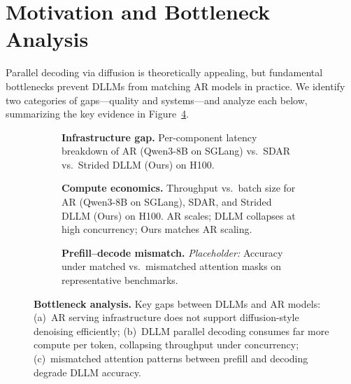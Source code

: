 \section{Motivation and Bottleneck Analysis}
\label{sec:motivation}

Parallel decoding via diffusion is theoretically appealing, but fundamental bottlenecks prevent DLLMs from matching AR models in practice. We identify two categories of gaps---quality and systems---and analyze each below, summarizing the key evidence in Figure~\ref{fig:bottlenecks}.

\begin{figure}[t]
\begin{center}
\begin{subfigure}[t]{0.32\textwidth}
\centering
\fbox{\rule[-.5cm]{0cm}{3.5cm} \rule[-.5cm]{0pt}{0cm}\hspace{3.8cm}}
\caption{\textbf{Infrastructure gap.} Per-component latency breakdown of AR (Qwen3-8B on SGLang) vs.\ SDAR vs.\ Strided DLLM (Ours) on H100. }
\label{fig:infra_bottleneck}
\end{subfigure}
\hfill
\begin{subfigure}[t]{0.32\textwidth}
\centering
\fbox{\rule[-.5cm]{0cm}{3.5cm} \rule[-.5cm]{0pt}{0cm}\hspace{3.8cm}}
\caption{\textbf{Compute economics.} Throughput vs.\ batch size for AR (Qwen3-8B on SGLang), SDAR, and Strided DLLM (Ours) on H100. AR scales; DLLM collapses at high concurrency; Ours matches AR scaling. }
\label{fig:compute_bottleneck}
\end{subfigure}
\hfill
\begin{subfigure}[t]{0.32\textwidth}
\centering
\fbox{\rule[-.5cm]{0cm}{3.5cm} \rule[-.5cm]{0pt}{0cm}\hspace{3.8cm}}
\caption{\textbf{Prefill--decode mismatch.} \textit{Placeholder:} Accuracy under matched vs.\ mismatched attention masks on representative benchmarks.}
\label{fig:prefill_bottleneck}
\end{subfigure}
\end{center}
\caption{\textbf{Bottleneck analysis.} Key gaps between DLLMs and AR models: (a)~AR serving infrastructure does not support diffusion-style denoising efficiently; (b)~DLLM parallel decoding consumes far more compute per token, collapsing throughput under concurrency; (c)~mismatched attention patterns between prefill and decoding degrade DLLM accuracy.}
\label{fig:bottlenecks}
\end{figure}

